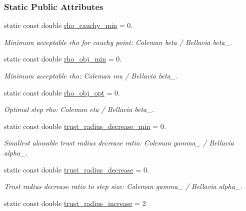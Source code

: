 \subsubsection*{Static Public Attributes}
\begin{DoxyCompactItemize}
\item 
static const double \hyperlink{classmappel_1_1estimator_1_1TrustRegionMaximizer_a72f2a3cf0c2c9a89f516fe4d64981660}{rho\+\_\+cauchy\+\_\+min} = 0.
\begin{DoxyCompactList}\small\item\em Minimum acceptable rho for cauchy point\+: Coleman beta / Bellavia beta\+\_. \end{DoxyCompactList}\item 
static const double \hyperlink{classmappel_1_1estimator_1_1TrustRegionMaximizer_ace606c3accfccbab718561d9f09acd71}{rho\+\_\+obj\+\_\+min} = 0.
\begin{DoxyCompactList}\small\item\em Minimum acceptable rho\+: Coleman mu / Bellavia beta\+\_. \end{DoxyCompactList}\item 
static const double \hyperlink{classmappel_1_1estimator_1_1TrustRegionMaximizer_aad57ec37be10886756806ec66600f6d7}{rho\+\_\+obj\+\_\+opt} = 0.
\begin{DoxyCompactList}\small\item\em Optimal step rho\+: Coleman eta / Bellavia beta\+\_. \end{DoxyCompactList}\item 
static const double \hyperlink{classmappel_1_1estimator_1_1TrustRegionMaximizer_a0b90cfb34a88617378caa32312f0ad3b}{trust\+\_\+radius\+\_\+decrease\+\_\+min} = 0.
\begin{DoxyCompactList}\small\item\em Smallest alowable trust radius decrease ratio\+: Coleman gamma\+\_ / Bellavia alpha\+\_. \end{DoxyCompactList}\item 
static const double \hyperlink{classmappel_1_1estimator_1_1TrustRegionMaximizer_aa96d97d1e10a98270d7de5bbb7131c33}{trust\+\_\+radius\+\_\+decrease} = 0.
\begin{DoxyCompactList}\small\item\em Trust radius decrease ratio to step size\+: Coleman gamma\+\_ / Bellavia alpha\+\_. \end{DoxyCompactList}\item 
static const double \hyperlink{classmappel_1_1estimator_1_1TrustRegionMaximizer_a8a75c91757ab34a01d0eaed90987e023}{trust\+\_\+radius\+\_\+increase} = 2

\end{DoxyCompactItemize}
